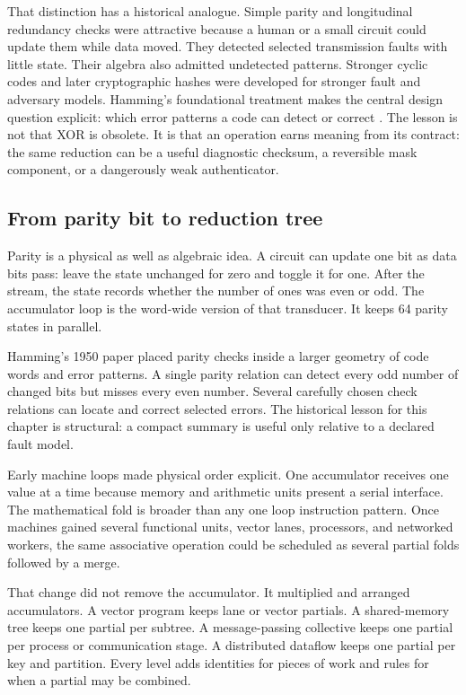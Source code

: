 That distinction has a historical analogue. Simple parity and longitudinal
redundancy checks were attractive because a human or a small circuit could
update them while data moved. They detected selected transmission faults with
little state. Their algebra also admitted undetected patterns. Stronger cyclic
codes and later cryptographic hashes were developed for stronger fault and
adversary models. Hamming's foundational treatment makes the central design
question explicit: which error patterns a code can detect or correct
\autocite{hamming1950codes}. The lesson is not that XOR is obsolete. It is that an
operation earns meaning from its contract: the same reduction can be a useful
diagnostic checksum, a reversible mask component, or a dangerously weak
authenticator.

\subsection{From parity bit to reduction tree}

Parity is a physical as well as algebraic idea. A circuit can update one bit
as data bits pass: leave the state unchanged for zero and toggle it for one.
After the stream, the state records whether the number of ones was even or
odd. The accumulator loop is the word-wide version of that transducer. It
keeps 64 parity states in parallel.

Hamming's 1950 paper placed parity checks inside a larger geometry of code
words and error patterns. A single parity relation can detect every odd number
of changed bits but misses every even number. Several carefully chosen check
relations can locate and correct selected errors. The historical lesson for
this chapter is structural: a compact summary is useful only relative to a
declared fault model.

Early machine loops made physical order explicit. One accumulator receives
one value at a time because memory and arithmetic units present a serial
interface. The mathematical fold is broader than any one loop instruction
pattern. Once machines gained several functional units, vector lanes,
processors, and networked workers, the same associative operation could be
scheduled as several partial folds followed by a merge.

That change did not remove the accumulator. It multiplied and arranged
accumulators. A vector program keeps lane or vector partials. A shared-memory
tree keeps one partial per subtree. A message-passing collective keeps one
partial per process or communication stage. A distributed dataflow keeps one
partial per key and partition. Every level adds identities for pieces of work
and rules for when a partial may be combined.

